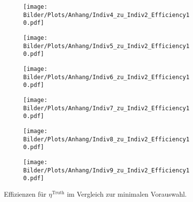 \begin{figure}
  \begin{subfigure}[t]{0.5\textwidth}
  \texttt{[image: Bilder/Plots/Anhang/Indiv4\_zu\_Indiv2\_Efficiency10.pdf]}
  \end{subfigure}
\begin{subfigure}[t]{0.5\textwidth}
 \texttt{[image: Bilder/Plots/Anhang/Indiv5\_zu\_Indiv2\_Efficiency10.pdf]}
\end{subfigure}
\begin{subfigure}[t]{0.5\textwidth}
  \texttt{[image: Bilder/Plots/Anhang/Indiv6\_zu\_Indiv2\_Efficiency10.pdf]}
\end{subfigure}
\begin{subfigure}[t]{0.5\textwidth}
  \texttt{[image: Bilder/Plots/Anhang/Indiv7\_zu\_Indiv2\_Efficiency10.pdf]}
\end{subfigure}
\begin{subfigure}[t]{0.5\textwidth}
  \texttt{[image: Bilder/Plots/Anhang/Indiv8\_zu\_Indiv2\_Efficiency10.pdf]}
\end{subfigure}
\begin{subfigure}[t]{0.5\textwidth}
  \texttt{[image: Bilder/Plots/Anhang/Indiv9\_zu\_Indiv2\_Efficiency10.pdf]}
\end{subfigure}
\caption{Effizienzen für $\eta^{\text{Truth}}$ im Vergleich zur minimalen Vorauswahl.}
\end{figure}

